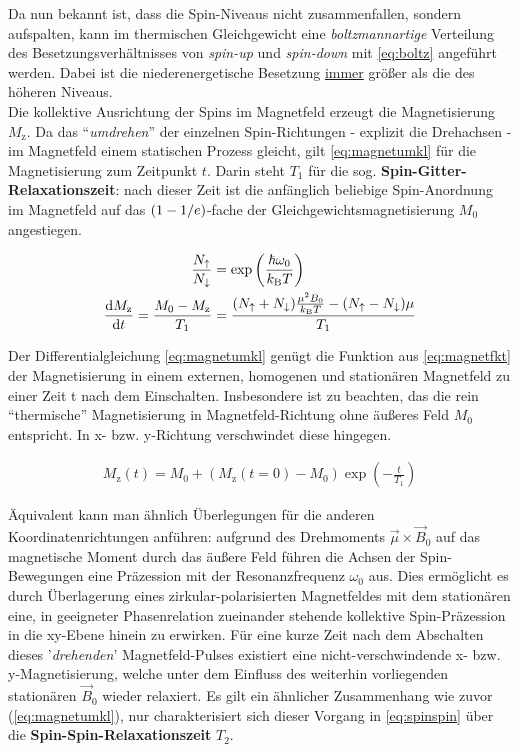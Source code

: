 \documentclass[numbers=noenddot,a4paper,notitlepage,twoside,BCOR15mm]{scrartcl}
\newcommand{\diff}{\textnormal{d}}
\newcommand{\ix}[1]{_\text{#1}}
\newcommand{\tilt}[1]{\textit{#1}}
\newcommand{\euler}{\mathnormal{e}}
\newcommand{\fett}[1]{\textbf{#1}}
\begin{document}
			Da nun bekannt ist, dass die Spin-Niveaus nicht zusammenfallen, sondern aufspalten, kann im thermischen Gleichgewicht eine \tilt{boltzmannartige} Verteilung des Besetzungsverhältnisses von \tilt{spin-up} und \tilt{spin-down} mit \autoref{eq:boltz} angeführt werden. Dabei ist die niederenergetische Besetzung \underline{immer} größer als die des höheren Niveaus.\\
			Die kollektive Ausrichtung der Spins im Magnetfeld erzeugt die Magnetisierung $M\ix{z}$. Da das "`\tilt{umdrehen}"' der einzelnen Spin-Richtungen - explizit die Drehachsen - im Magnetfeld einem statischen Prozess gleicht, gilt \autoref{eq:magnetumkl} für die Magnetisierung zum Zeitpunkt $t$. Darin steht $T\ix{1}$ für die sog. \fett{Spin-Gitter-Relaxationszeit}: nach dieser Zeit ist die anfänglich beliebige Spin-Anordnung im Magnetfeld auf das $(1-1/\euler)$-fache der Gleichgewichtsmagnetisierung $M\ix{0}$ angestiegen.

				\begin{align}
					\frac{N_{\uparrow}}{N_{\downarrow}}& =\exp\left(\frac{\hbar\omega\ix{0}}{k\ix{B}T}\right) \label{eq:boltz}\\
					\frac{\diff M\ix{z}}{\diff t}=\frac{M\ix{0}-M\ix{z}}{T\ix{1}}&=\frac{(N_{\uparrow}+N_{\downarrow})\frac{\mu^2B\ix{0}}{k\ix{B}T}-(N_{\uparrow}-N_{\downarrow})\mu}{T\ix{1}} \label{eq:magnetumkl}
				\end{align}

			Der Differentialgleichung \autoref{eq:magnetumkl} genügt die Funktion aus \autoref{eq:magnetfkt} der Magnetisierung in einem externen, homogenen und stationären Magnetfeld zu einer Zeit t nach dem Einschalten. Insbesondere ist zu beachten, das die rein "`thermische"' Magnetisierung in Magnetfeld-Richtung ohne äußeres Feld $M\ix{0}$ entspricht. In x- bzw. y-Richtung verschwindet diese hingegen.

				\begin{align}
					M\ix{z}(t)=M\ix{0}+(M\ix{z}(t=0)-M\ix{0})\exp\left(-\frac{t}{T\ix{1}}\right) \label{eq:magnetfkt}
				\end{align}

				Äquivalent kann man ähnlich Überlegungen für die anderen Koordinatenrichtungen anführen: aufgrund des Drehmoments $\vec{\mu}\times\vec{B}\ix{0}$ auf das magnetische Moment durch das äußere Feld führen die Achsen der Spin-Bewegungen eine Präzession mit der Resonanzfrequenz $\omega\ix{0}$ aus. Dies ermöglicht es durch Überlagerung eines zirkular-polarisierten Magnetfeldes mit dem stationären eine, in geeigneter Phasenrelation zueinander stehende kollektive Spin-Präzession in die xy-Ebene hinein zu erwirken. Für eine kurze Zeit nach dem Abschalten dieses '\tilt{drehenden}' Magnetfeld-Pulses existiert eine nicht-verschwindende x- bzw. y-Magnetisierung, welche unter dem Einfluss des weiterhin vorliegenden stationären $\vec{B}\ix{0}$ wieder relaxiert. Es gilt ein ähnlicher Zusammenhang wie zuvor (\autoref{eq:magnetumkl}), nur charakterisiert sich dieser Vorgang in \autoref{eq:spinspin} über die \fett{Spin-Spin-Relaxationszeit} $T\ix{2}$.
\end{document}
